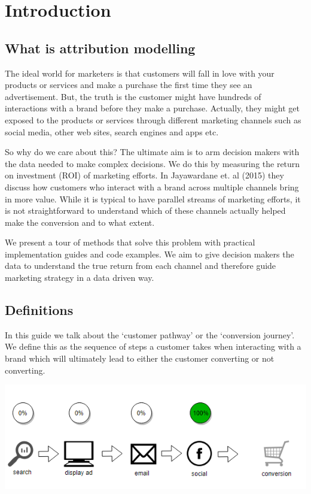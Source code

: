 \documentclass[]{book}
\begin{document}
\hypertarget{introduction}{%
\chapter{Introduction}\label{introduction}}

\hypertarget{what-is-attribution-modelling}{%
\section{What is attribution modelling}\label{what-is-attribution-modelling}}

The ideal world for marketers is that customers will fall in love with your
products or services and make a purchase the first time they see an advertisement.
But, the truth is the customer might have hundreds of interactions with a
brand before they make a purchase. Actually, they might get exposed to the
products or services through different marketing channels such as social media,
other web sites, search engines and apps etc.

So why do we care about this? The ultimate aim is to arm decision makers with
the data needed to make complex decisions. We do this by measuring the return on
investment (ROI) of marketing efforts. In Jayawardane et. al (2015) they discuss
how customers who interact with a brand across multiple channels bring in more
value. While it is typical to have parallel streams of marketing efforts,
it is not straightforward to understand which of these channels actually helped make
the conversion and to what extent.

We present a tour of methods that solve this problem with practical implementation
guides and code examples. We aim to give decision
makers the data to understand the true return from each channel and therefore
guide marketing strategy in a data driven way.

\hypertarget{definitions}{%
\section{Definitions}\label{definitions}}

In this guide we talk about the `customer pathway' or the `conversion journey'.
We define this as the sequence of steps a customer takes when interacting with a brand
which will ultimately lead to either the customer converting
or not converting.

\includegraphics[width=5.88in]{img/last_touch}
\end{document}
